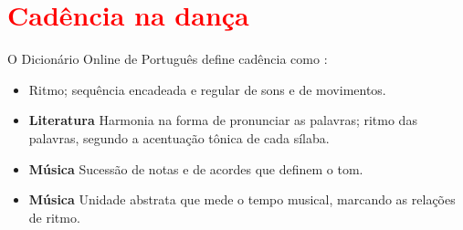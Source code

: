\section{\textcolor{red}{Cadência na dança }}

\begin{definition}[Cadência] 
\label{def:cadencia}
O Dicionário Online de Português define cadência como \cite{diciocadencia}:
\begin{itemize}
\item Ritmo; sequência encadeada e regular de sons e de movimentos.
\item \textbf{Literatura} Harmonia na forma de pronunciar as palavras; ritmo das palavras, segundo a acentuação tônica de cada sílaba.
\item \textbf{Música} Sucessão de notas e de acordes que definem o tom.
\item \textbf{Música} Unidade abstrata que mede o tempo musical, marcando as relações de ritmo.
\end{itemize}
\end{definition}





